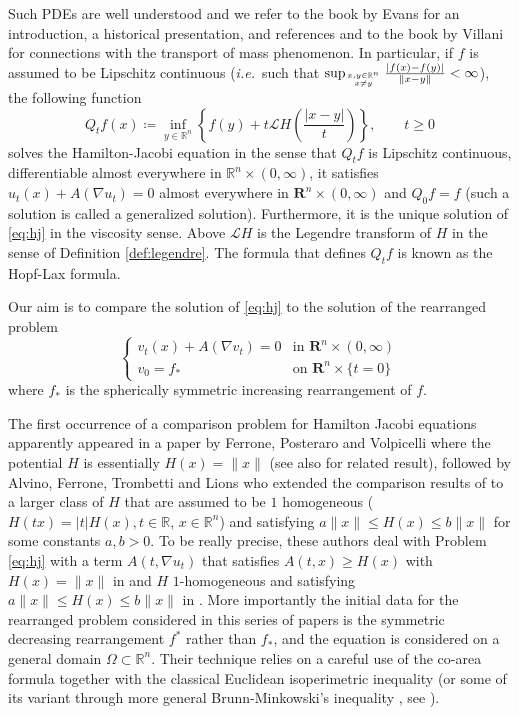 \documentclass[11pt]{article}
\newcommand{\1}{[1]}
\begin{document}
Such PDEs are well understood and we refer to the book by Evans \cite{evans} for an introduction, a historical presentation, and references and to the book by Villani \cite{villani} for connections with the transport of mass phenomenon.
In particular, if $f$ is assumed to be Lipschitz continuous (\textit{i.e.}\ such that $\sup_{\genfrac{}{}{0pt}{}{x,y\in \mathbb{R}^n}{x\neq y}} \frac{|f(x)-f(y)|}{\|x-y\|} < \infty$), the following function 
$$
Q_tf(x) \coloneqq \inf_{y \in \mathbb{R}^n} \left\{ f(y) + t\mathcal{L}H \left(\frac{|x-y|}{t} \right)  \right\}, \qquad t \geq 0
$$
solves the Hamilton-Jacobi equation in the sense that
$Q_tf$ is Lipschitz continuous, differentiable almost everywhere in $\mathbb{R}^n \times(0,\infty)$, it satisfies $u_t(x) + A(\nabla u_t) = 0$ almost everywhere in $\mathbf{R}^n \times (0 ,\infty)$
and $Q_0f=f$ (such a solution is called a generalized solution). Furthermore, it is the unique solution of \eqref{eq:hj} in the viscosity sense. Above $\mathcal{L}H$ is the Legendre transform of $H$ in the sense of Definition \ref{def:legendre}.
The formula that defines $Q_tf$ is known as the Hopf-Lax formula.

Our aim is to compare the solution of \eqref{eq:hj} to the solution of the rearranged problem
\begin{equation} \label{eq:hj-rearranged}
\begin{cases}
v_t(x) + A(\nabla v_t) = 0 & \mbox{in } \mathbf{R}^n \times (0 ,\infty) \\
v_0=f_* & \mbox{on } \mathbf{R}^n \times \{t =0\} 
\end{cases}
\end{equation}
where $f_*$ is the spherically symmetric increasing rearrangement of $f$.

The first occurrence of a comparison problem for Hamilton Jacobi equations apparently appeared in a paper by Ferrone, Posteraro and Volpicelli \cite{FPV} where the potential $H$ is essentially $H(x)=\|x\|$ (see also \cite{giarrusso-nunziante,giarrusso,mercaldo} for related result), followed by 
Alvino, Ferrone, Trombetti and Lions \cite{AFTL} who extended the comparison results of \cite{FPV} to a larger class of $H$ that are assumed to be $1$ homogeneous ($H(tx)=|t|H(x), t \in \mathbb{R}$, $x \in \mathbb{R}^n$) and satisfying $a\|x\| \leq H(x) \leq b\|x\|$ for some constants $a,b >0$. To be really precise, these authors deal with 
Problem \eqref{eq:hj} with a term $A(t,\nabla u_t)$ that satisfies   $A(t,x) \geq H(x)$ with $H(x)=\|x\|$ in \cite{FPV} and $H$ $1$-homogeneous and satisfying $a\|x\| \leq H(x) \leq b\|x\|$ in \cite{AFTL}. More importantly the initial data for the rearranged problem considered in this series of papers is the symmetric decreasing rearrangement $f^*$ rather than $f_*$, and the equation is considered on a general domain $\Omega \subset \mathbb{R}^n$.  Their technique relies on a careful use of the co-area formula together with the classical Euclidean isoperimetric inequality (or some of its variant through more general Brunn-Minkowski's inequality \cite{busemann}, see \cite[Sections 2 and 4.2]{AFTL}).
\end{document}
